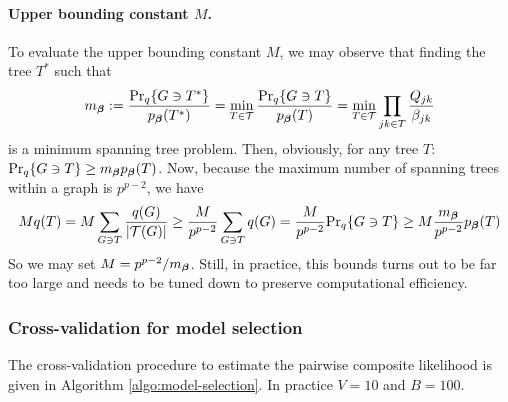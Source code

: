 \paragraph{Upper bounding constant $M$.}
To evaluate the upper bounding constant $M$, we may observe that finding the tree $T^*$ such that
$$
m_{\boldsymbol{\beta}} 
:= \frac{{\Pr}_q\{G \ni T^*\}}{p_{\boldsymbol{\beta}}(T^*)}
= \min_{T \in {\mathcal{T}}} \frac{{\Pr}_q\{G \ni T\}}{p_{\boldsymbol{\beta}}(T)} = \min_{T \in {\mathcal{T}}} \prod_{jk \in T} \frac{Q_{jk}}{\beta_{jk}}
$$
is a minimum spanning tree problem. Then, obviously, for any tree $T$: ${\Pr}_q\{G \ni T\} \geq m_{\boldsymbol{\beta}} p_{\boldsymbol{\beta}}(T)$.
Now, because the maximum number of spanning trees within a graph is $p^{p-2}$, we have
$$
M q(T)
= M \sum_{G \ni T} \frac{q(G)}{|{\mathcal{T}}(G)|} 
\geq \frac{M}{p^{p-2}} \sum_{G \ni T} q(G)
= \frac{M}{p^{p-2}} {\Pr}_q\{G \ni T\}
\geq M \frac{m_{\boldsymbol{\beta}}}{p^{p-2}}  p_{\boldsymbol{\beta}}(T)
$$
So we may set $M = p^{p-2} / m_{\boldsymbol{\beta}}$. Still, in practice, this bounds turns out to be far too large and needs to be tuned down to preserve computational efficiency.

 
\subsubsection{Cross-validation for model selection} \label{eq:cvAlgo}
\label{CV}

The cross-validation procedure to estimate the pairwise composite likelihood is given in Algorithm \ref{algo:model-selection}. In practice $V=10$ and $B = 100$.


